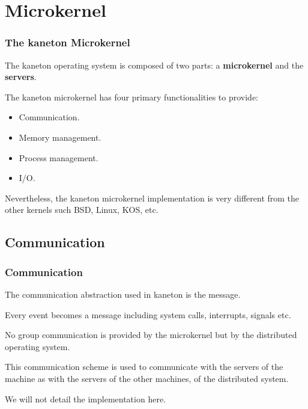 \section{Microkernel}


\begin{frame}
  \frametitle{The kaneton Microkernel}

  The kaneton operating system is composed of two parts: a
  \textbf{microkernel} and the \textbf{servers}.

  \-

  The kaneton microkernel has four primary functionalities
  to provide:

  \begin{itemize}[<+->]
    \item
      Communication.
    \item
      Memory management.
    \item
      Process management.
    \item
      I/O.
  \end{itemize}

  \-

  Nevertheless, the kaneton microkernel implementation is very different
  from the other kernels such BSD, Linux, KOS, etc.
\end{frame}

%
%

\subsection{Communication}


\begin{frame}
  \frametitle{Communication}

  The communication abstraction used in kaneton is the message.

  \-

  Every event becomes a message including system calls, interrupts,
  signals etc.

  \-

  No group communication is provided by the microkernel but by the distributed
  operating system.

  \-

  This communication scheme is used to communicate with the servers
  of the machine as with the servers of the other machines, of
  the distributed system.

  \-

  We will not detail the implementation here.
\end{frame}

